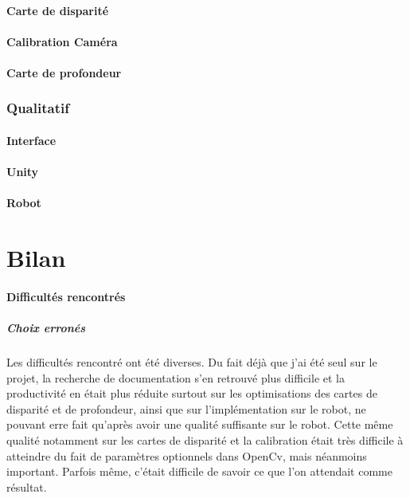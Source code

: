 \documentclass{article}
\begin{document}

\subsection{Carte de disparité}


\subsection{Calibration Caméra}


\subsection{Carte de profondeur}


\section{Qualitatif}

\subsection{Interface}

\subsection{Unity}

\subsection{Robot}

\newpage
\part{Bilan}

\subsection{Difficultés rencontrés}

\subsubsection{Choix erronés}
Les difficultés rencontré ont été diverses. Du fait déjà que j'ai été seul sur le projet, la recherche de documentation s'en retrouvé plus difficile et la productivité en était plus réduite surtout sur les optimisations des cartes de disparité et de profondeur, ainsi que sur l'implémentation sur le robot, ne pouvant erre fait qu’après avoir une qualité suffisante sur le robot. Cette même qualité notamment sur les cartes de disparité et la calibration était très difficile à atteindre du fait de paramètres optionnels dans OpenCv, mais néanmoins important. Parfois même, c'était difficile de savoir ce que l'on attendait comme résultat. 
\end{document}

